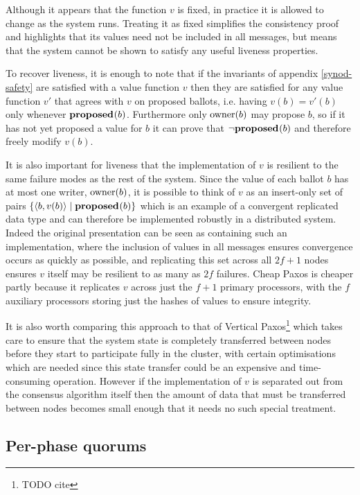 \documentclass[journal]{IEEEtran}
\begin{document}
Although it appears that the function $v$ is fixed, in practice it is allowed
to change as the system runs. Treating it as fixed simplifies the consistency
proof and highlights that its values need not be included in all messages, but
means that the system cannot be shown to satisfy any useful liveness
properties.

To recover liveness, it is enough to note that if the invariants of appendix
\ref{synod-safety} are satisfied with a value function $v$ then they are
satisfied for any value function $v'$ that agrees with $v$ on proposed ballots,
i.e. having $v(b) = v'(b)$ only whenever $\mathbf{proposed}_{}(b)$.  Furthermore only
$\mathrm{owner}(b)$ may propose $b$, so if it has not yet proposed a value for $b$ it
can prove that $\neg\mathbf{proposed}_{}(b)$ and therefore freely modify $v(b)$.

It is also important for liveness that the implementation of $v$ is resilient
to the same failure modes as the rest of the system. Since the value of each
ballot $b$ has at most one writer, $\mathrm{owner}(b)$, it is possible to think of $v$
as an insert-only set of pairs ${\{ \langle b, v(b) \rangle \mid \mathbf{proposed}_{}(b)
\}}$ which is an example of a convergent replicated data type\cite{crdts} and
can therefore be implemented robustly in a distributed system. Indeed the
original presentation can be seen as containing such an implementation, where
the inclusion of values in all messages ensures convergence occurs as quickly
as possible, and replicating this set across all ${2f+1}$ nodes ensures $v$
itself may be resilient to as many as $2f$ failures. Cheap Paxos is cheaper
partly because it replicates $v$ across just the ${f+1}$ primary processors,
with the $f$ auxiliary processors storing just the hashes of values to ensure
integrity.

It is also worth comparing this approach to that of Vertical
Paxos\footnote{TODO cite} which takes care to ensure that the system state is
completely transferred between nodes before they start to participate fully in
the cluster, with certain optimisations which are needed since this state
transfer could be an expensive and time-consuming operation. However if the
implementation of $v$ is separated out from the consensus algorithm itself then
the amount of data that must be transferred between nodes becomes small enough
that it needs no such special treatment.

\subsection{Per-phase quorums}\label{per-phase-quorums}
\end{document}
